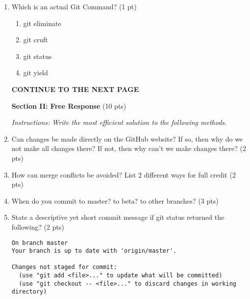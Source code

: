 \documentclass[11pt,fleqn]{article}
\begin{document}
\begin{enumerate}
  \vspace{4ex}

\item Which is an actual Git\textsuperscript\textregistered\xspace Command? (1 pt)
	\begin{enumerate}
    	\item git eliminate
    	\item git cruft
    	\item git status
    	\item git yield
	\end{enumerate}

  \vfill
  \begin{center}
  \textbf{CONTINUE TO THE NEXT PAGE}
  \end{center}

	\newpage

  \begin{center}
  \begin{large}
    \textbf{Section II: Free Response} (10 pts)
  \end{large}
  \end{center}
  \textit{Instructions: Write the most efficient solution to the following methods.}

\item Can changes be made directly on the GitHub website? If so, then why do we not make all changes there? If not, then why can't we make changes there? (2 pts)

\vspace{28ex}

\item How can merge conflicts be avoided? List 2 different ways for full credit (2 pts)

\vspace{32ex}


\item When do you commit to master? to beta? to other branches? (3 pts)

\vspace{32ex}


\item State a descriptive yet short commit message if git status returned the following? (2 pts)
\begin{verbatim}
On branch master
Your branch is up to date with 'origin/master'.

Changes not staged for commit:
  (use "git add <file>..." to update what will be committed)
  (use "git checkout -- <file>..." to discard changes in working directory)


\end{verbatim}
\end{enumerate}
\end{document}
